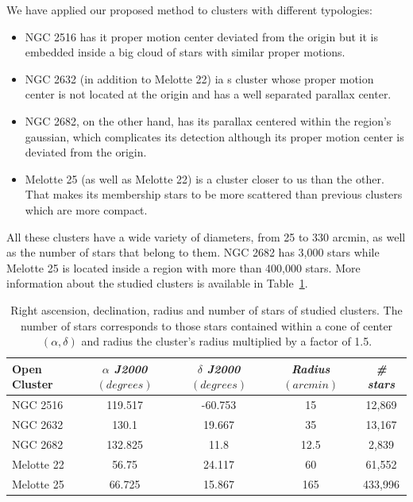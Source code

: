 \documentclass[11pt, a4paper, english]{book}
\begin{document}
We have applied our proposed method to clusters with different typologies:

\begin{itemize}
  \item NGC 2516 has it proper motion center deviated from the origin but
        it is embedded inside a big cloud of stars with similar proper motions.
  \item NGC 2632 (in addition to Melotte 22) ia s cluster whose proper motion center
        is not located at the origin and has a well separated parallax center.
  \item NGC 2682, on the other hand, has its parallax centered within the region's gaussian,
        which complicates its detection although its proper motion center is deviated from the origin.
  \item Melotte 25 (as well as Melotte 22) is a cluster closer to us than the other.
        That makes its membership stars to be more scattered than previous clusters which are more compact.
\end{itemize}

All these clusters have a wide variety of diameters, from 25 to 330 arcmin,
as well as the number of stars that belong to them. NGC 2682 has 3,000 stars
while Melotte 25 is located inside a region with more than 400,000 stars.
More information about the studied clusters is available in Table~\ref{tab:clusters_summary}.

\begin{table}[h!]
  \begin{center}
    \begin{tabular}{l|c|c|c|c}
      \textbf{Open Cluster} & \emph{$\alpha$ J2000 $(degrees)$} & \emph{$\delta$ J2000 $(degrees)$} & \emph{Radius $(arcmin)$} & \emph{\# stars} \\
      \hline
      NGC 2516 & 119.517 & -60.753 & 15 & 12,869 \\
      NGC 2632 & 130.1 & 19.667 & 35 & 13,167 \\
      NGC 2682 & 132.825 & 11.8 & 12.5 & 2,839 \\
      Melotte 22 & 56.75 & 24.117 & 60 & 61,552 \\
      Melotte 25 & 66.725 & 15.867 & 165 & 433,996 \\
    \end{tabular}
    \caption{Right ascension, declination, radius and number of stars of studied clusters.
             The number of stars corresponds to those stars contained within a cone of center
             \((\alpha, \delta)\) and radius the cluster's radius multiplied by a factor of 1.5.}
    \label{tab:clusters_summary}
  \end{center}
\end{table}
\end{document}
